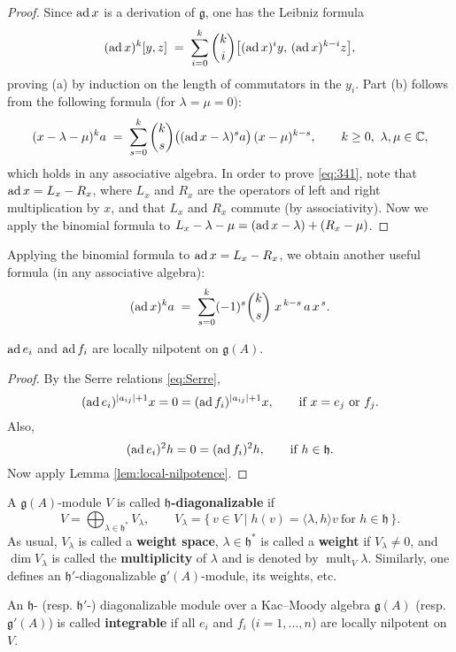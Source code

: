 \documentclass[12pt]{article}
\begin{document}
\begin{proof}
    Since $\operatorname{ad} x$ is a derivation of $\mathfrak{g}$, one has the Leibniz formula
    \[
        (\operatorname{ad} x)^k [y,z] \;=\; \sum_{i=0}^{k} \binom{k}{i}
        \big[(\operatorname{ad} x)^i y,\, (\operatorname{ad} x)^{k-i} z\big],
    \]
    proving (a) by induction on the length of commutators in the $y_i$.
    Part (b) follows from the following formula (for $\lambda=\mu=0$):
    \begin{equation}\label{eq:341}
        (x-\lambda-\mu)^k a \;=\; \sum_{s=0}^{k} \binom{k}{s}
        \big((\ad x-\lambda)^s a\big)\,(x-\mu)^{k-s}, \qquad k\ge 0,\ \lambda,\mu\in\mathbb{C},
    \end{equation}
    which holds in any associative algebra. In order to prove \eqref{eq:341}, note
    that $\operatorname{ad} x=L_x-R_x$, where $L_x$ and $R_x$ are the operators of left and right
    multiplication by $x$, and that $L_x$ and $R_x$ commute (by associativity).
    Now we apply the binomial formula to $L_x-\lambda-\mu=(\operatorname{ad} x-\lambda)+(R_x-\mu)$.
    \qedhere
\end{proof}

Applying the binomial formula to $\operatorname{ad} x=L_x-R_x$, we obtain another useful
formula (in any associative algebra):
\begin{equation}\label{eq:342}
    (\operatorname{ad} x)^k a \;=\; \sum_{s=0}^{k}(-1)^s \binom{k}{s}\; x^{\,k-s}\, a\, x^{\,s}.
\end{equation}

\begin{lemma}\label{lem:Chevalley-nilpotent}
    $\operatorname{ad} e_i$ and $\operatorname{ad} f_i$ are locally nilpotent on $\mathfrak{g}(A)$.
\end{lemma}

\begin{proof}
    By the Serre relations \eqref{eq:Serre},
    \[
        (\operatorname{ad} e_i)^{|a_{ij}|+1}x = 0 = (\operatorname{ad} f_i)^{|a_{ij}|+1}x, \qquad
        \text{if } x=e_j \text{ or } f_j.
    \]
    Also,
    \[
        (\operatorname{ad} e_i)^2 h = 0 = (\operatorname{ad} f_i)^2 h, \qquad \text{if } h\in \mathfrak{h}.
    \]
    Now apply Lemma \ref{lem:local-nilpotence}.
\end{proof}


\begin{definition}
    A $\mathfrak{g}(A)$-module $V$ is called \textbf{$\mathfrak{h}$-diagonalizable} if
    \[
        V = \bigoplus_{\lambda\in\mathfrak{h}^*} V_\lambda,
        \qquad
        V_\lambda = \{\,v\in V \mid h(v) = \langle \lambda,h\rangle v
        \ \text{for } h\in\mathfrak{h}\,\}.
    \]
    As usual, $V_\lambda$ is called a \textbf{weight space},
    $\lambda \in \mathfrak{h}^*$ is called a \textbf{weight} if $V_\lambda \neq 0$,
    and $\dim V_\lambda$ is called the \textbf{multiplicity} of $\lambda$ and is denoted
    by $\operatorname{mult}_V \lambda$. Similarly, one defines an $\mathfrak{h}'$-diagonalizable
    $\mathfrak{g}'(A)$-module, its weights, etc.

    An $\mathfrak{h}$- (resp. $\mathfrak{h}'$-) diagonalizable module over a Kac--Moody
    algebra $\mathfrak{g}(A)$ (resp. $\mathfrak{g}'(A)$) is called \textbf{integrable} if all $e_i$ and $f_i$ ($i=1,\dots,n$) are locally nilpotent on $V$.
\end{definition}
\end{document}
